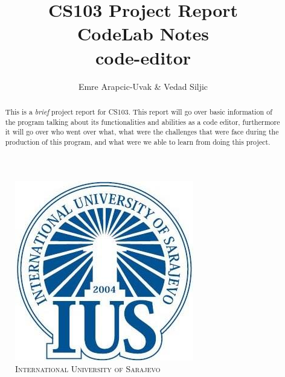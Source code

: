 \documentclass[a4paper, 11pt]{article}
\title{CS103 Project Report \\ CodeLab Notes \\ \small{code-editor}}
\author{Emre Arapcic-Uvak & Vedad Siljic}
\date{}
\begin{document}
	\begin{figure}
		\centering
		\includegraphics[scale = 0.5]{IUS_Logo}
		\\ \vspace{5mm}
		\noindent \large{\textsc{International University of Sarajevo}}
	\end{figure}
	\maketitle
	\vspace{5mm}

	\begin{abstract}
		\noindent This is a \emph{brief} project report for CS103. This report will go over basic information of the program talking about its functionalities and abilities as a code editor, furthermore it will go over who went over what, what were the challenges that were face during the production of this program, and what were we able to learn from doing this project.
	\end{abstract}
	\pagebreak
	
	\tableofcontents
	\pagebreak
	
\end{document}
